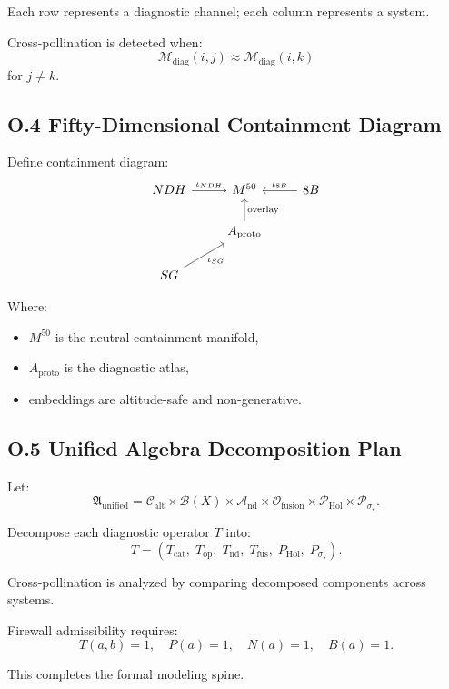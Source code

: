 Each row represents a diagnostic channel; each column represents a system.

Cross-pollination is detected when:
\[
\mathcal{M}_{\mathrm{diag}}(i,j)
\approx
\mathcal{M}_{\mathrm{diag}}(i,k)
\]
for $j \neq k$.

\subsection*{O.4 Fifty-Dimensional Containment Diagram}

Define containment diagram:
\[
\begin{tikzcd}
NDH \arrow[r, "\iota_{NDH}"] & M^{50} & 8B \arrow[l, "\iota_{8B}"'] \\
& A_{\mathrm{proto}} \arrow[u, "\mathrm{overlay}"'] & \\
SG \arrow[ur, "\iota_{SG}"'] & &
\end{tikzcd}
\]

Where:
\begin{itemize}
    \item $M^{50}$ is the neutral containment manifold,
    \item $A_{\mathrm{proto}}$ is the diagnostic atlas,
    \item embeddings are altitude-safe and non-generative.
\end{itemize}

\subsection*{O.5 Unified Algebra Decomposition Plan}

Let:
\[
\mathfrak{A}_{\mathrm{unified}}
=
\mathcal{C}_{\mathrm{alt}}
\times
\mathcal{B}(X)
\times
\mathcal{A}_{\mathrm{nd}}
\times
\mathcal{O}_{\mathrm{fusion}}
\times
\mathcal{P}_{\mathrm{Hol}}
\times
\mathcal{P}_{\sigma_{\star}}.
\]

Decompose each diagnostic operator $T$ into:
\[
T =
(T_{\mathrm{cat}},\;
T_{\mathrm{op}},\;
T_{\mathrm{nd}},\;
T_{\mathrm{fus}},\;
P_{\mathrm{Hol}},\;
P_{\sigma_{\star}}).
\]

Cross-pollination is analyzed by comparing decomposed components across systems.

Firewall admissibility requires:
\[
T(a,b)=1,\quad
P(a)=1,\quad
N(a)=1,\quad
B(a)=1.
\]

This completes the formal modeling spine.
